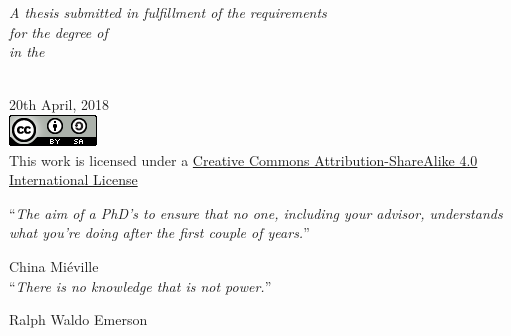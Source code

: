 \documentclass[
11pt, %
english, %
onehalfspacing, %
nolistspacing, %
headsepline, %
consistentlayout, %
]{MastersDoctoralThesis} %
\begin{document}
\begin{titlepage}
\begin{center}
\large \textit{A thesis submitted in fulfillment of the requirements\\ for the degree of \degreename}\\[0.2cm] %
\textit{in the}\\[0.2cm]
\groupname\\\deptname

{\large 20th April, 2018}\\[0.5cm] %

\includegraphics[scale=0.75]{images/cc-by-sa.png}\\
{\small This work is licensed under a 
\href{http://creativecommons.org/licenses/by-sa/4.0/}
	{Creative Commons Attribution-ShareAlike 4.0 International License}}
 
\vfill
\end{center}
\end{titlepage}

\cleardoublepage


\vspace*{0.2\textheight}

\noindent\enquote{\itshape The aim of a PhD's to ensure that no one, including
your advisor, understands what you're doing after the first couple of
years.}\bigbreak

\hfill China Mi\'eville\\[0.5cm]

\noindent\enquote{\itshape There is no knowledge that is not power.}\bigbreak

\hfill Ralph Waldo Emerson

\end{document}
